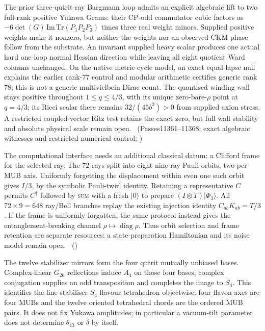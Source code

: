 The prior three-qutrit-ray Bargmann loop admits an explicit algebraic lift to
two full-rank positive Yukawa Grams: their CP-odd commutator cubic factors as
$-6\det(G)\,\mathrm{Im}\,\mathrm{Tr}(P_1P_2P_3)$ times three real weight
minors. Supplied positive weights make it nonzero, but neither the weights
nor an observed CKM phase follow from the substrate. An invariant supplied
heavy scalar produces one actual hard one-loop normal Hessian direction while
leaving all eight quotient Ward columns unchanged. On the native metric-cycle
model, an exact equal-lapse null explains the earlier rank-$77$ control and
modular arithmetic certifies generic rank $78$; this is not a generic
multivielbein Dirac count. The quantised winding wall stays positive throughout
$1\le q\le4/3$, with its unique zero-bare-$\rho$ point at $q=4/3$; its
Ricci scalar there remains $32/(45b^2)>0$ from supplied axion stress. A
restricted coupled-vector Ritz test retains the exact zero, but full wall
stability and absolute physical scale remain open.
\tierC\ (Passes11361--11368; exact algebraic witnesses and restricted numerical control;
)





The computational interface needs an additional classical datum: a Clifford
frame for the selected ray. The $72$ rays split into eight nine-ray Pauli
orbits, two per MUB axis. Uniformly forgetting the displacement within even
one such orbit gives $I/3$, by the symbolic Pauli-twirl identity. Retaining a
representative $C$ permits $C^\dagger$ followed by \textsc{sum} with a fresh
$|0\rangle$ to prepare $(I\otimes T)|\Phi_3\rangle$. All $72\times9=648$
ray/Bell branches replay the existing injection identity
$C_{ab}K_{ab}=T/3$. If the frame is uniformly forgotten, the same protocol
instead gives the entanglement-breaking channel $\rho\mapsto\operatorname{diag}\rho$.
Thus orbit selection and frame retention are separate resources; a
state-preparation Hamiltonian and its noise model remain open.
\tierC\ ()

The twelve stabilizer mirrors form the four qutrit mutually unbiased bases. Complex-linear
$G_{26}$ reflections induce $A_4$ on those four bases; complex conjugation supplies an odd
transposition and completes the image to $S_4$. This identifies the line-stabiliser
$S_4$ flavour tetrahedron objectwise: four flavon axes are four MUBs and the twelve
oriented tetrahedral chords are the ordered MUB pairs. It does not fix Yukawa amplitudes;
in particular a vacuum-tilt parameter does not determine $\theta_{13}$ or $\delta$ by
itself. 

